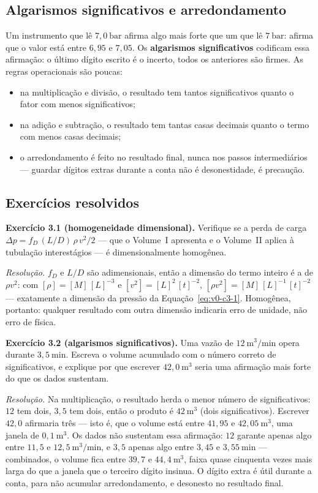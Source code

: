 \documentclass[12pt,a4paper]{article}
\numberwithin{equation}{section}
\numberwithin{table}{section}
\numberwithin{figure}{section}
\begin{document}
\subsection{Algarismos significativos e arredondamento}

Um instrumento que lê $7{,}0\ \mathrm{bar}$ afirma algo mais forte que um
que lê $7\ \mathrm{bar}$: afirma que o valor está entre $6{,}95$ e
$7{,}05$. Os \textbf{algarismos significativos} codificam essa afirmação:
o último dígito escrito é o incerto, todos os anteriores são firmes. As
regras operacionais são poucas:

\begin{itemize}
\item na multiplicação e divisão, o resultado tem tantos significativos
  quanto o fator com menos significativos;
\item na adição e subtração, o resultado tem tantas casas decimais quanto
  o termo com menos casas decimais;
\item o arredondamento é feito no resultado final, nunca nos passos
  intermediários --- guardar dígitos extras durante a conta não é
  desonestidade, é precaução.
\end{itemize}

\subsection{Exercícios resolvidos}

\textbf{Exercício 3.1 (homogeneidade dimensional).} Verifique se a perda de
carga $\Delta p = f_D\,(L/D)\,\rho\,v^2/2$ --- que o Volume~I apresenta e o
Volume~II aplica à tubulação interestágios --- é dimensionalmente
homogênea.

\emph{Resolução.} $f_D$ e $L/D$ são adimensionais, então a dimensão do
termo inteiro é a de $\rho v^2$: com $[\rho] = [M]\,[L]^{-3}$ e
$[v^2] = [L]^2\,[t]^{-2}$,
$[\rho v^2] = [M]\,[L]^{-1}\,[t]^{-2}$ --- exatamente a dimensão da
pressão da Equação~\eqref{eq:v0-c3-1}. Homogênea, portanto: qualquer
resultado com outra dimensão indicaria erro de unidade, não erro de
física.

\textbf{Exercício 3.2 (algarismos significativos).} Uma vazão de
$12\ \mathrm{m^3/min}$ opera durante $3{,}5\ \mathrm{min}$. Escreva o
volume acumulado com o número correto de significativos, e explique por
que escrever $42{,}0\ \mathrm{m^3}$ seria uma afirmação mais forte do
que os dados sustentam.

\emph{Resolução.} Na multiplicação, o resultado herda o menor número de
significativos: $12$ tem dois, $3{,}5$ tem dois, então o produto é
$42\ \mathrm{m^3}$ (dois significativos). Escrever $42{,}0$ afirmaria
três --- isto é, que o volume está entre $41{,}95$ e
$42{,}05\ \mathrm{m^3}$, uma janela de $0{,}1\ \mathrm{m^3}$. Os dados
não sustentam essa afirmação: $12$ garante apenas algo entre $11{,}5$ e
$12{,}5\ \mathrm{m^3/min}$, e $3{,}5$ apenas algo entre $3{,}45$ e
$3{,}55\ \mathrm{min}$ --- combinados, o volume fica entre $39{,}7$ e
$44{,}4\ \mathrm{m^3}$, faixa quase cinquenta vezes mais larga do que a
janela que o terceiro dígito insinua. O dígito extra é útil durante a
conta, para não acumular arredondamento, e desonesto no resultado final.
\end{document}
